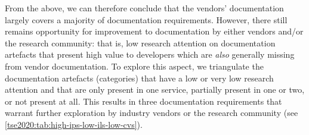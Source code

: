 From the above, we can therefore conclude that the vendors' documentation largely covers a majority of  documentation requirements. However, there still remains opportunity for improvement to  documentation by either vendors and/or the research community: that is, low research attention on documentation artefacts that present high value to developers which are \textit{also} generally missing from vendor documentation. To explore this aspect, we triangulate the documentation artefacts (categories) that have a low or very low research attention and that are only present in one service, partially present in one or two, or not present at all. This results in three documentation requirements that warrant further exploration by industry vendors or the research community (see \cref{tse2020:tab:high-ips-low-ils-low-cvs}).

